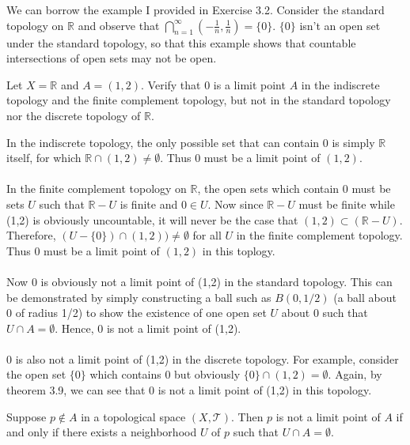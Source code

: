 \documentclass[letterpaper,12pt,twoside]{maths}
\begin{document}
\begin{solution}
    We can borrow the example I provided in Exercise 3.2. 
    Consider the standard
    topology on $\mathbb{R}$ and observe that $\displaystyle \bigcap_{n=1}^\infty
    \left(-\frac{1}{n}, \frac{1}{n}\right) = \{0\}$. $\{0\}$ isn't an open set under
    the standard topology, so that this example shows that countable
    intersections of open sets may not be open. 
\end{solution}


\begin{exercise}[Exercise 3.8]
    Let $X = \mathbb{R}$ and $A = (1,2)$. Verify
    that 0 is a limit point $A$ in the indiscrete topology and the finite
    complement topology, but not in the standard topology nor the discrete
    topology of $\mathbb{R}.$ 
\end{exercise}

\begin{solution}
    In the indiscrete topology, the only possible set that can contain 0
is simply $\mathbb{R}$ itself, for which $\mathbb{R} \cap (1,2) \ne
\emptyset$. Thus 0 must be a limit point of $(1,2)$. \\
\\
In the finite complement topology on $\mathbb{R}$, the open sets which
contain 0 must be sets $U$ such that $\mathbb{R} - U$ is finite and $0
\in U$. Now since $\mathbb{R} - U$ must be finite while (1,2) is obviously
uncountable, it will never be the case that $(1, 2) \subset (\mathbb{R}
- U)$. Therefore, 
$(U - \{0\}) \cap (1,2)) \ne \emptyset$ for all $U$ in the finite
complement topology. Thus 0 must be a limit point
of $(1,2)$ in this toplogy. \\
\\
Now 0 is obviously not a limit point of (1,2) in the standard
topology. This can be demonstrated by simply constructing a ball such
as $B(0, 1/2)$ (a ball about $0$ of radius 1/2) to show the existence
of one open set $U$ about $0$ such that $U \cap A = \emptyset$. Hence,
0 is not a limit point of (1,2).\\
\\
0 is also not a limit point of (1,2) in the discrete topology. For
example, consider the open set $\{0\}$ which contains 0 but obviously
$\{0\} \cap (1,2) = \emptyset.$ Again, by theorem 3.9, we can see that
0 is not a limit point of (1,2) in this topology.

\end{solution}

\begin{problem}[Theorem 3.9] Suppose $p \notin A$ in a topological
space $(X, \mathscr{T})$. Then $p$ is not a limit point of $A$ if and
only if there exists a neighborhood $U$ of $p$ such that $U \cap A =
\emptyset$.
\end{problem}
\end{document}
